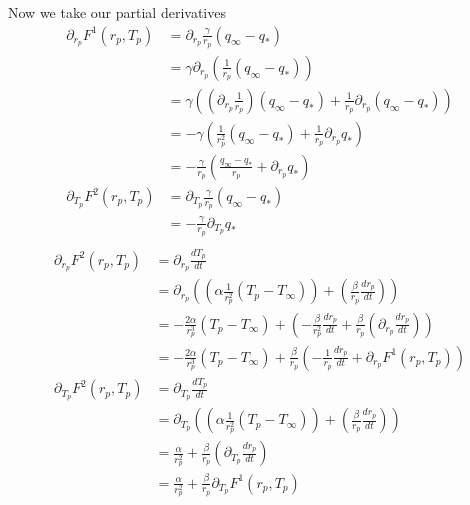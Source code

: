 \documentclass{article}
\begin{document}
Now we take our partial derivatives
\begin{align*}
    \partial_{r_{p}}F^1(r_{p},T_{p}) &= \partial_{r_{p}}\frac{\gamma}{r_{p}}(q_{\infty} - q_*)\\
                                     &= \gamma\partial_{r_{p}}\left(\frac{1}{r_{p}}(q_{\infty} - q_*)\right)\\
                                     &= \gamma\left(\left(\partial_{r_{p}}\frac{1}{r_{p}}\right)(q_{\infty} - q_*)
				      + \frac{1}{r_{p}}\partial_{r_{p}}(q_{\infty} - q_*)\right)\\
                                     &=-\gamma\left(\frac{1}{r_{p}^2}(q_{\infty} - q_*)
				      + \frac{1}{r_{p}}\partial_{r_{p}}q_*\right)\\
				     &= -\frac{\gamma}{r_{p}}\left(\frac{q_{\infty} - q_*}{r_{p}}
				                                + \partial_{r_{p}}q_*\right)\\
    \partial_{T_{p}}F^2(r_{p},T_{p}) &= \partial_{T_{p}}\frac{\gamma}{r_{p}}(q_{\infty} - q_*)\\
				     &= -\frac{\gamma}{r_{p}}\partial_{T_{p}}q_*\\
\end{align*}
\begin{align*}
    \partial_{r_{p}}F^2(r_{p}, T_{p}) &= \partial_{r_{p}}\frac{dT_{p}}{dt}\\
                                      &= \partial_{r_{p}}\left(\left(\alpha\frac{1}{r_{p}^2}(T_{p}-T_{\infty})\right)
				       + \left(\frac{\beta}{r_{p}}\frac{dr_{p}}{dt}\right)\right)\\
                                      &= -\frac{2\alpha}{r_{p}^3}(T_{p}-T_{\infty})
				        + \left(-\frac{\beta}{r_{p}^2}\frac{dr_{p}}{dt}
				        + \frac{\beta}{r_{p}}\left(\partial_{r_{p}}\frac{dr_{p}}{dt}\right)\right)\\
                                      &= -\frac{2\alpha}{r_{p}^3}(T_{p}-T_{\infty})
				        + \frac{\beta}{r_p}\left(-\frac{1}{r_{p}}\frac{dr_{p}}{dt}
				        + \partial_{r_{p}}F^1(r_{p},T_{p})\right)\\
    \partial_{T_{p}}F^2(r_{p}, T_{p}) &= \partial_{T_{p}}\frac{dT_{p}}{dt}\\
                                      &= \partial_{T_{p}}\left(\left(\alpha\frac{1}{r_{p}^2}(T_{p}-T_{\infty})\right)
				       + \left(\frac{\beta}{r_{p}}\frac{dr_{p}}{dt}\right)\right)\\
                                      &= \frac{\alpha}{r_{p}^2}+\frac{\beta}{r_{p}}\left(\partial_{T_{p}}\frac{dr_{p}}{dt}\right)\\
                                      &= \frac{\alpha}{r_{p}^2}+\frac{\beta}{r_{p}}\partial_{T_{p}}F^1(r_{p},T_{p})
\end{align*}
\end{document}
